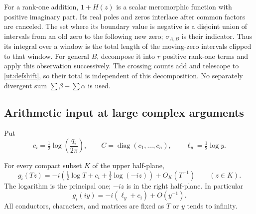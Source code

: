 \begin{remark}
For a rank-one addition, $1+H(z)$ is a scalar meromorphic function with
positive imaginary part. Its real poles and zeros interlace after common
factors are canceled. The set where its boundary value is negative is a
disjoint union of intervals from an old zero to the following new zero;
$\sigma_{A,B}$ is their indicator. Thus its integral over a window is
the total length of the moving-zero intervals clipped to that window.
For general $B$, decompose it into $r$ positive rank-one terms and apply
this observation successively. The crossing counts add and telescope
to \eqref{ut:defshift}, so their total is independent of this decomposition.
No separately divergent sum $\sum\beta-\sum\alpha$ is used.
\end{remark}

\subsection{Arithmetic input at large complex arguments}

Put
\begin{equation}\label{ut:conductorconstants}
 c_i=\tfrac12\log\!\left(\frac{q_i}{2\pi}\right),\qquad
 C=\operatorname{diag}(c_1,\ldots,c_n),\qquad
 \ell_y=\tfrac12\log y.
\end{equation}

\begin{lemma}\label{ut:radial}
For every compact subset $K$ of the upper half-plane,
\begin{equation}\label{ut:radial-asymptotic}
 g_i(Tz)=-i\left(\tfrac12\log T+c_i+\tfrac12\log(-iz)\right)
                    +O_K(T^{-1})\qquad(z\in K).
\end{equation}
The logarithm is the principal one; $-iz$ is in the right half-plane.
In particular
\begin{equation}\label{ut:imag-asymptotic}
 g_i(iy)=-i(\ell_y+c_i)+O(y^{-1}).
\end{equation}
All conductors, characters, and matrices are fixed as $T$ or $y$ tends
to infinity.
\end{lemma}

